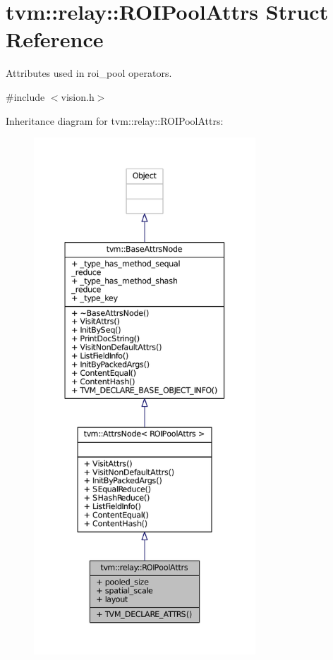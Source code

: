 \hypertarget{structtvm_1_1relay_1_1ROIPoolAttrs}{}\section{tvm\+:\+:relay\+:\+:R\+O\+I\+Pool\+Attrs Struct Reference}
\label{structtvm_1_1relay_1_1ROIPoolAttrs}


Attributes used in roi\+\_\+pool operators.  




{\ttfamily \#include $<$vision.\+h$>$}



Inheritance diagram for tvm\+:\+:relay\+:\+:R\+O\+I\+Pool\+Attrs\+:
\nopagebreak
\begin{figure}[H]
\begin{center}
\leavevmode
\includegraphics[height=550pt]{structtvm_1_1relay_1_1ROIPoolAttrs__inherit__graph}
\end{center}
\end{figure}


